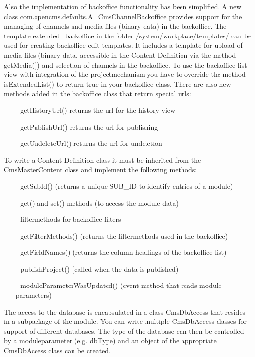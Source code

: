 Also the implementation of backoffice functionality has been simplified. 
A new class {\class com.opencms.defaults.A\_CmsChannelBackoffice} provides support for the
managing of channels and media files (binary data) in the backoffice. The template
extended\_backoffice in the folder /system/workplace/templates/ can be used for creating
backoffice edit templates. It includes a template for upload of media files (binary data, 
accessible in the Content Definition via the method {\meth getMedia()})
and selection of channels in the backoffice. To use the backoffice list view with 
integration of the projectmechanism you have to override the method {\meth isExtendedList()}
to return true in your backoffice class. 
There are also new methods added in the backoffice class that return special urls:

\begin{itemize}
\item[-] getHistoryUrl() returns the url for the history view 
\item[-] getPublishUrl() returns the url for publishing
\item[-] getUndeleteUrl() returns the url for undeletion
\end{itemize}

To write a Content Definition class it must be inherited from the 
{\class CmsMasterContent} class and implement the following methods:

\begin{itemize}
\item[-] {\meth getSubId()} (returns a unique SUB\_ID to identify entries of a module)
\item[-] {\meth get()} and {\name set()} methods (to access the module data)
\item[-] filtermethods for backoffice filters 
\item[-] {\meth getFilterMethods()} (returns the filtermethods used in the backoffice)
\item[-] {\meth getFieldNames()} (returns the column headings of the backoffice list) 
\item[-] {\meth publishProject()} (called when the data is published)
\item[-] {\meth moduleParameterWasUpdated()} (event-method that reads module parameters)
\end{itemize}

The access to the database is encapsulated in a class {\name CmsDbAccess} that resides in a subpackage
of the module. You can write multiple {\name CmsDbAccess} classes for support of different databases.
The type of the database can then be controlled by a moduleparameter (e.g. {\name dbType}) and an
object of the appropriate {\name CmsDbAccess} class can be created.

